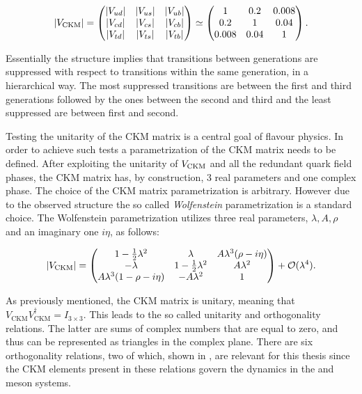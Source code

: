 \begin{equation}
  |V_{\text{CKM}}|
                   = \begin{pmatrix} |V_{ud}| & |V_{us}| & |V_{ub}| \\ |V_{cd}| & |V_{cs}| & |V_{cb}| \\ |V_{td}| & |V_{ts}| & |V_{tb}| \end{pmatrix}
              \simeq \begin{pmatrix} 1 & 0.2 & 0.008 \\ 0.2 & 1 & 0.04 \\ 0.008 & 0.04 & 1 \end{pmatrix}.
      \label{CKMmatrix}
  \end{equation}

\noindent Essentially the structure implies that transitions between generations
are suppressed with respect to transitions within the same generation, in a hierarchical way. The most suppressed transitions are between
the first and third generations followed by the ones between the second and third and the least suppressed are between first and second.

Testing the unitarity of the CKM matrix is a central goal of flavour physics. In order to achieve such tests a
parametrization of the CKM matrix needs to be defined. After exploiting the unitarity of $V_{\rm CKM}$ and all the 
redundant quark field phases, the CKM matrix has, by construction, 3 real parameters and one complex phase.
The choice of the CKM matrix parametrization is \aprior arbitrary. However due to the observed structure the so called
{\it Wolfenstein} \cite{Wolfenstein:1983yz,Buras-wolfenstein} parametrization is a standard choice. 
The Wolfenstein parametrization utilizes three real parameters, $\lambda,A,\rho$ and an imaginary one $i\eta$, as follows:

\begin{equation}
\centering
  |V_{\text{CKM}}|
                   = \begin{pmatrix} \VudWolf & \VusWolf & \VubWolf \\
                                     \VcdWolf & \VcsWolf & \VcbWolf \\
                                     \VtdWolf & \VtsWolf & \VtbWolf \end{pmatrix} + \mathcal{O}(\lambda^4).
      \label{CKMwolfenstein}
\end{equation}

\noindent As previously mentioned, the CKM matrix is unitary, meaning that $V_{\text{CKM}} V_{\text{CKM}}^\dagger = I_{3\times3}$.
This leads to the so called unitarity and orthogonality relations. The latter are sums of complex numbers that are equal to zero,
and thus can be represented as triangles in the complex plane. There are six orthogonality relations, two of which, shown
in , are relevant for this thesis since the CKM elements present in these relations govern the
dynamics in the \Bs and \Bd meson systems.

